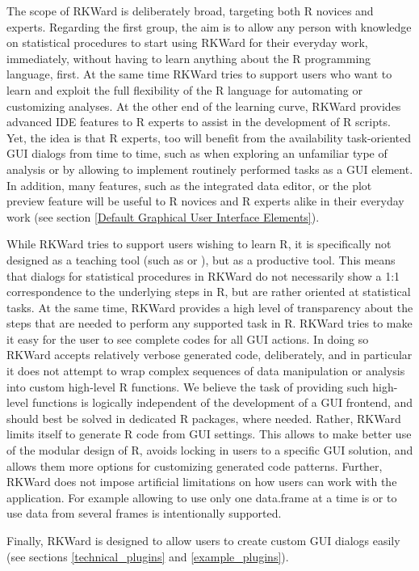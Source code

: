 \documentclass[article,shortnames]{jss}
\begin{document}
The scope of RKWard is deliberately broad, targeting both R novices and experts.
Regarding the first group, the aim is to allow any person with knowledge on
statistical procedures to start using RKWard for their everyday work,
immediately, without having to learn anything about the R programming language,
first. At the same time RKWard tries to support users who want to learn and
exploit the full flexibility of the R language for automating or customizing
analyses. At the other end of the learning curve, RKWard provides advanced IDE
features to R experts to assist in the development of R scripts. Yet, the idea
is that R experts, too will benefit from the availability task-oriented GUI
dialogs from time to time, such as when exploring an unfamiliar type of analysis
or by allowing to implement routinely performed tasks as a GUI element. In
addition, many features, such as the integrated data editor, or the plot preview
feature will be useful to R novices and R experts alike in their everyday work
(see section \ref{Default Graphical User Interface Elements}).

While RKWard tries to support users wishing to learn R, it is specifically not
designed as a teaching tool (such as  or ), but as a
productive tool. This means that dialogs for statistical procedures in RKWard do
not necessarily show a 1:1 correspondence to the underlying steps in R, but are
rather oriented at statistical tasks. At the same time, RKWard provides a high
level of transparency about the steps that are needed to perform any supported
task in R. RKWard tries to make it easy for the user to see complete codes for
all GUI actions. In doing so RKWard accepts relatively verbose generated code,
deliberately, and in particular it does not attempt to wrap complex sequences of
data manipulation or analysis into custom high-level R functions. We believe the
task of providing such high-level functions is logically independent of the
development of a GUI frontend, and should best be solved in dedicated R
packages, where needed. Rather, RKWard limits itself to generate R code from GUI
settings. This allows to make better use of the modular design of R, avoids
locking in users to a specific GUI solution, and allows them more options for
customizing generated code patterns. Further, RKWard does not impose artificial
limitations on how users can work with the application. For example allowing to
use only one data.frame at a time is or to use data from several frames is
intentionally supported.

Finally, RKWard is designed to allow users to create custom GUI dialogs easily
(see sections \ref{technical_plugins} and \ref{example_plugins}).
\end{document}

